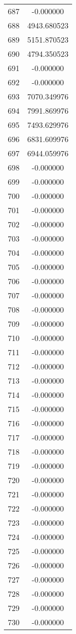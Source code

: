 \documentclass[12pt]{article}
\begin{document}
\begin{longtable}{@{}cc@{}}
687 & -0.000000 \\
688 & 4943.680523 \\
689 & 5151.870523 \\
690 & 4794.350523 \\
691 & -0.000000 \\
692 & -0.000000 \\
693 & 7070.349976 \\
694 & 7991.869976 \\
695 & 7493.629976 \\
696 & 6831.609976 \\
697 & 6944.059976 \\
698 & -0.000000 \\
699 & -0.000000 \\
700 & -0.000000 \\
701 & -0.000000 \\
702 & -0.000000 \\
703 & -0.000000 \\
704 & -0.000000 \\
705 & -0.000000 \\
706 & -0.000000 \\
707 & -0.000000 \\
708 & -0.000000 \\
709 & -0.000000 \\
710 & -0.000000 \\
711 & -0.000000 \\
712 & -0.000000 \\
713 & -0.000000 \\
714 & -0.000000 \\
715 & -0.000000 \\
716 & -0.000000 \\
717 & -0.000000 \\
718 & -0.000000 \\
719 & -0.000000 \\
720 & -0.000000 \\
721 & -0.000000 \\
722 & -0.000000 \\
723 & -0.000000 \\
724 & -0.000000 \\
725 & -0.000000 \\
726 & -0.000000 \\
727 & -0.000000 \\
728 & -0.000000 \\
729 & -0.000000 \\
730 & -0.000000 \\

\end{longtable}
\end{document}
